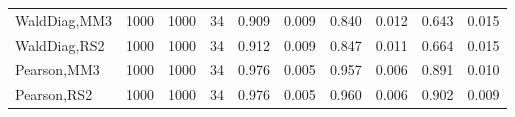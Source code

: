 \documentclass[
]{article}
\begin{document}
\begin{table}[H]
{\begin{tabular}[t]{lrrrrrrlrr}
\hspace{1em}WaldDiag,MM3 & 1000 & 1000 & 34 & 0.909 & 0.009 & 0.840 & 0.012 & 0.643 & 0.015\\
\hspace{1em}WaldDiag,RS2 & 1000 & 1000 & 34 & 0.912 & 0.009 & 0.847 & 0.011 & 0.664 & 0.015\\
\hspace{1em}Pearson,MM3 & 1000 & 1000 & 34 & 0.976 & 0.005 & 0.957 & 0.006 & 0.891 & 0.010\\
\hspace{1em}Pearson,RS2 & 1000 & 1000 & 34 & 0.976 & 0.005 & 0.960 & 0.006 & 0.902 & 0.009\\
\bottomrule
\end{tabular}}
\endgroup{}
\end{table}
\end{document}
